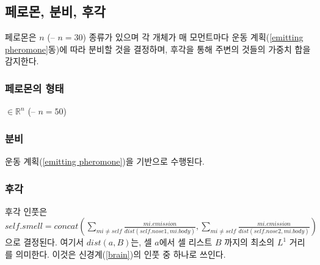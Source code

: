 \documentclass[a4paper,12pt]{article}
\begin{document}
\subsection{페로몬, 분비, 후각}
페로몬은 $n$ (-- $n=30$) 종류가 있으며 각 개체가 매 모먼트마다 운동 계획(\ref{emitting pheromone}동)에 따라 분비할 것을 결정하며, 후각을 통해 주변의 것들의 가중치 합을 감지한다.
\subsubsection{페로몬의 형태}\label{pheromone form}
$\in\mathbb{R}^n$ (-- $n=50$)
\subsubsection{분비}\label{emission}
운동 계획(\ref{emitting pheromone})을 기반으로 수행된다.
\subsubsection{후각}\label{olfactory input}
후각 인풋은 $self.smell=concat(\sum_{mi\neq self}\frac{mi.emission}{dist(self.nose1,mi.body)},\sum_{mi\neq self}\frac{mi.emission}{dist(self.nose2,mi.body)})$으로 결정된다. 
여기서 $dist(a,B)$는, 셀 $a$에서 셀 리스트 $B$ 까지의 최소의 $L^1$ 거리를 의미한다. 이것은 신경계(\ref{brain})의 인풋 중 하나로 쓰인다. 
\end{document}
